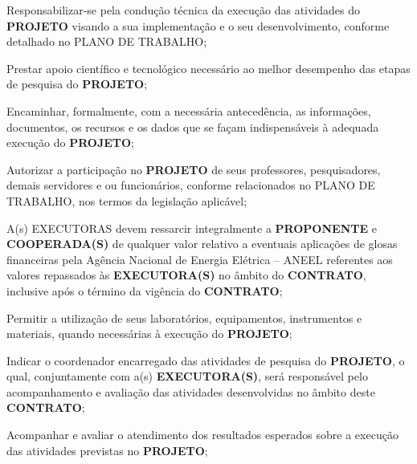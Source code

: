 \xx Responsabilizar-se pela condução técnica da execução das atividades do \textbf{PROJETO} visando a sua implementação e o seu desenvolvimento, conforme detalhado no PLANO DE TRABALHO;

\xx Prestar apoio científico e tecnológico necessário ao melhor desempenho das etapas de pesquisa do \textbf{PROJETO};

\xx Encaminhar, formalmente, com a necessária antecedência, as informações, documentos, os recursos e os dados que se façam indispensáveis à adequada execução do \textbf{PROJETO};

\xx Autorizar a participação no \textbf{PROJETO} de seus professores, pesquisadores, demais servidores e ou funcionários, conforme relacionados no PLANO DE TRABALHO, nos termos da legislação aplicável;

\xx A(s) EXECUTORAS devem ressarcir integralmente a \textbf{PROPONENTE} e \textbf{COOPERADA(S)} de qualquer valor relativo a eventuais aplicações de glosas financeiras pela Agência Nacional de Energia Elétrica – ANEEL referentes aos valores repassados às \textbf{EXECUTORA(S)} no âmbito do \textbf{CONTRATO}, inclusive após o término da vigência do \textbf{CONTRATO};

\xx Permitir a utilização de seus laboratórios, equipamentos, instrumentos e materiais, quando necessárias à execução do \textbf{PROJETO};

\xx Indicar o coordenador encarregado das atividades de pesquisa do \textbf{PROJETO}, o qual, conjuntamente com a(s) \textbf{EXECUTORA(S)}, será responsável pelo acompanhamento e avaliação das atividades desenvolvidas no âmbito deste \textbf{CONTRATO};

\xx Acompanhar e avaliar o atendimento dos resultados esperados sobre a execução das atividades previstas no \textbf{PROJETO};

